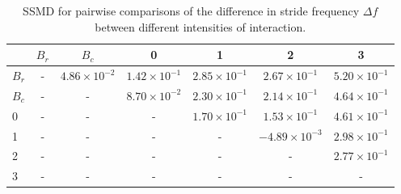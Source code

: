 \begin{table}
\centering
\caption{SSMD for pairwise comparisons of the difference in stride frequency $\Delta f$ between different intensities of interaction.}
\label{tab:ssmd_delta_f}
\begin{tabular}{lcccccc}
\toprule
 & $B_r$ & $B_c$ & 0 & 1 & 2 & 3 \\
\midrule
$B_r$ & - & $4.86 \times 10^{-2}$ & $1.42 \times 10^{-1}$ & $2.85 \times 10^{-1}$ & $2.67 \times 10^{-1}$ & $5.20 \times 10^{-1}$ \\
$B_c$ & - & - & $8.70 \times 10^{-2}$ & $2.30 \times 10^{-1}$ & $2.14 \times 10^{-1}$ & $4.64 \times 10^{-1}$ \\
0 & - & - & - & $1.70 \times 10^{-1}$ & $1.53 \times 10^{-1}$ & $4.61 \times 10^{-1}$ \\
1 & - & - & - & - & $-4.89 \times 10^{-3}$ & $2.98 \times 10^{-1}$ \\
2 & - & - & - & - & - & $2.77 \times 10^{-1}$ \\
3 & - & - & - & - & - & - \\
\bottomrule
\end{tabular}
\end{table}
